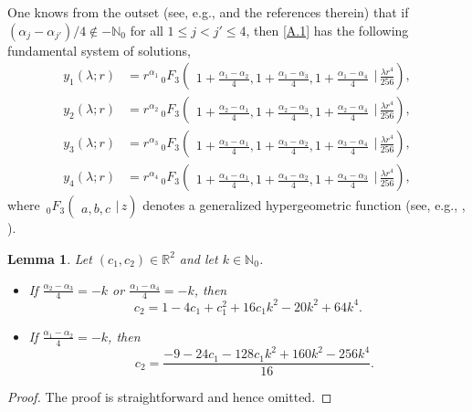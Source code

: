 \documentclass[reqno,11pt,centertags]{amsart}
\newcommand{\bbN}{{\mathbb{N}}}
\newcommand{\bbR}{{\mathbb{R}}}
\newcommand{\<}{\langle}
\renewcommand{\>}{\rangle}
\newcommand{\lb}{\label}
\numberwithin{equation}{section}
\newtheorem{lemma}[theorem]{Lemma}
\theoremstyle{definition}
\def\d{\displaystyle}
\begin{document}
One knows from the outset (see, e.g., \cite{GH23} and the references therein) that if $(\alpha_j-\alpha_{j'})/4\not\in -\bbN_0$ for all $1\leq j<j'\leq 4$, then \eqref{A.1} has the following fundamental system of solutions,
\begin{align}
y_1(\lambda;r)&=r^{\alpha_1} \,_{0} F_3\left(\!\begin{array}{c}\\
{ 1+\frac{\alpha_1-\alpha_2}{4}, 1+\frac{\alpha_1-\alpha_3}{4}, 1+\frac{\alpha_1-\alpha_4}{4}}
\end{array} \bigg\vert\,  \frac{\lambda r^4}{256} \right),\\
y_2(\lambda;r)&=r^{\alpha_2} \,_{0} F_3\left(\!\begin{array}{c}\\
{ 1+\frac{\alpha_2-\alpha_1}{4}, 1+\frac{\alpha_2-\alpha_3}{4}, 1+\frac{\alpha_2-\alpha_4}{4}}
\end{array} \bigg\vert\,  \frac{\lambda r^4}{256} \right),\\
y_3(\lambda;r)&=r^{\alpha_3} \,_{0} F_3\left(\!\begin{array}{c}\\
{ 1+\frac{\alpha_3-\alpha_1}{4}, 1+\frac{\alpha_3-\alpha_2}{4}, 1+\frac{\alpha_3-\alpha_4}{4}}
\end{array} \bigg\vert\,  \frac{\lambda r^4}{256} \right),\\
y_4(\lambda;r)&=r^{\alpha_4} \,_{0} F_3\left(\!\begin{array}{c}\\
{ 1+\frac{\alpha_4-\alpha_1}{4}, 1+\frac{\alpha_4-\alpha_2}{4}, 1+\frac{\alpha_4-\alpha_3}{4}}
\end{array} \bigg\vert\,  \frac{\lambda r^4}{256} \right),
\end{align}
where $\,_{0} F_3\left(\!\begin{array}{c}\\ { a, b, c} \end{array} \bigg\vert\,  z \right)$ denotes a generalized hypergeometric function (see, e.g., \cite[Ch.~IV]{EMOT53}, \cite[Ch.~16]{OLBC10}).

\begin{lemma} \lb{lA.1}
Let $(c_1,c_2)\in \bbR^2$ and let $k\in \bbN_0$.
\begin{itemize}
\item[(a)]
If $\d \frac{\alpha_2-\alpha_3}{4}=-k$ or $\d \frac{\alpha_1-\alpha_4}{4}=-k$, then
\begin{equation}\lb{E:equation of line}
 c_2=1 - 4 c_1 + c_1^2  + 16 c_1 k^2 - 20 k^2  + 64 k^4 .
\end{equation}
\item[(b)]
If $\d \frac{\alpha_1-\alpha_2}{4}=-k$,  then
\begin{equation}\lb{E:equation of parabola}
\quad c_2= \frac{-9 - 24 c_1 - 128 c_1 k^2 + 160 k^2  - 256 k^4}{16} .
\end{equation}
\end{itemize}
\end{lemma}
\begin{proof}
The proof is straightforward and hence omitted.
\end{proof}
\end{document}
